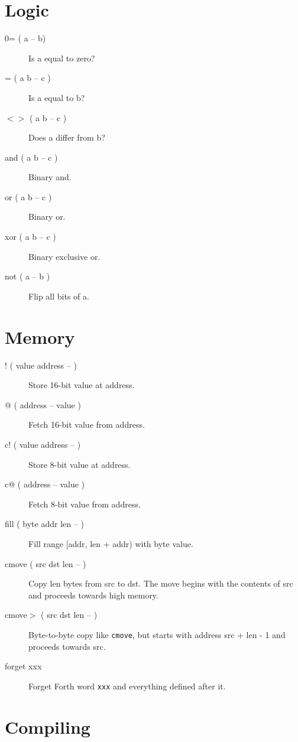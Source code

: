 \section{Logic}

\begin{description}
\item[0= ( a -- b)] Is a equal to zero?  
\item[= ( a b -- c )] Is a equal to b?
\item[$<>$ ( a b -- c )] Does a differ from b?
\item[and ( a b -- c )] Binary and.  
\item[or ( a b -- c )] Binary or.  
\item[xor ( a b -- c )] Binary exclusive or.  
\item[not ( a -- b )] Flip all bits of a.  
\end{description}

\section{Memory}

\begin{description}
\item[! ( value address -- )] Store 16-bit value at address.  
\item[@ ( address -- value )] Fetch 16-bit value from address.  
\item[c! ( value address -- )] Store 8-bit value at address.  
\item[c@ ( address -- value )] Fetch 8-bit value from address.
\item[fill ( byte addr len -- )] Fill range [addr, len + addr) with byte value.
\item[cmove ( src dst len -- )]
Copy len bytes from src to dst. The move begins with the contents of src and proceeds towards high memory.
\item[cmove$>$ ( src dst len -- )]
Byte-to-byte copy like \texttt{cmove}, but starts with address src + len - 1 and proceeds towards src.
\item[forget xxx] Forget Forth word \texttt{xxx} and everything defined after it.

\end{description}
\section{Compiling}

